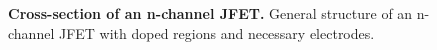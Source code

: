 {%

\begin{figure}[H]
    \renewcommand{\figurename}{Figure}
    \centering
    
    \caption{\textbf{Cross-section of an n-channel JFET.} General structure of an n-channel JFET with doped regions and 
    necessary electrodes.}  
    \label{fig:QuerschnittN-KanalJFET}
\end{figure}}




